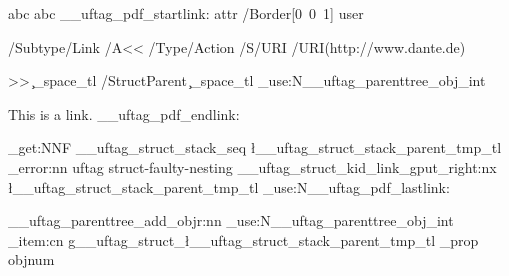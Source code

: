\documentclass{article}
\begin{document}
\leavevmode
{}
abc
\tagmcend
{}
abc
\tagmcend
{}
\ExplSyntaxOn\makeatletter
{}
\__uftag_pdf_startlink:
    attr {/Border[0~0~1]}
    user{
        /Subtype/Link%
        /A<<%
         /Type/Action%
         /S/URI%
         /URI(http://www.dante.de)%
         
         >>
         \c_space_tl
         /StructParent \c_space_tl \int_use:N\c@g__uftag_parenttree_obj_int
         }
    This is a link.
\__uftag_pdf_endlink:

\seq_get:NNF
    \g__uftag_struct_stack_seq
    \l__uftag_struct_stack_parent_tmp_tl
    {
     \msg_error:nn { uftag } { struct-faulty-nesting }
    }
\__uftag_struct_kid_link_gput_right:nx 
 { 
  \l__uftag_struct_stack_parent_tmp_tl 
 }
 {
  \int_use:N\__uftag_pdf_lastlink:
 }
 
 \__uftag_parenttree_add_objr:nn 
 {
  \int_use:N\c@g__uftag_parenttree_obj_int
 }
 { 
  \prop_item:cn{ g__uftag_struct_\l__uftag_struct_stack_parent_tmp_tl _prop } 
  { objnum }
 }

\ExplSyntaxOff
\tagmcend
\tagstructend
\tagstructend
\tagstructend
\end{document}
